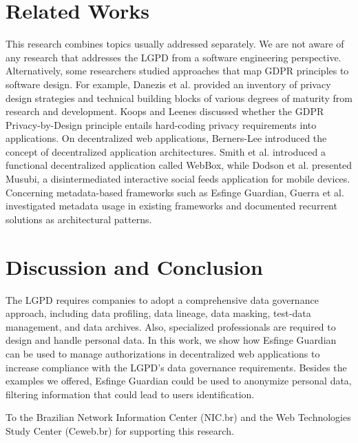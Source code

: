 \documentclass[sigconf]{acmart}
\begin{document}
\section{Related Works}

This research combines topics usually addressed separately. We are not aware of any research that addresses the LGPD from a software engineering perspective. Alternatively, some researchers studied approaches that map GDPR principles to software design. For example, Danezis et al. \cite{Ed2014} provided an inventory of privacy design strategies and technical building blocks of various degrees of maturity from research and development. Koops and Leenes \cite{Koops2014} discussed whether the GDPR Privacy-by-Design principle entails hard-coding privacy requirements into applications. On decentralized web applications, Berners-Lee \cite{Bern09} introduced the concept of decentralized application architectures. Smith et al. \cite{Smith2012} introduced a functional decentralized application called WebBox, while Dodson et al. \cite{Dodson2012} presented Musubi, a disintermediated interactive social feeds application for mobile devices. Concerning metadata-based frameworks such as Esfinge Guardian, Guerra et al. \cite{Guerra2010} investigated metadata usage in existing frameworks and documented recurrent solutions as architectural patterns.

\section{Discussion and Conclusion}

The LGPD requires companies to adopt a comprehensive data governance approach, including data profiling, data lineage, data masking, test-data management, and data archives. Also, specialized professionals are required to design and handle personal data. In this work, we show how Esfinge Guardian can be used to manage authorizations in decentralized web applications to increase compliance with the LGPD's data governance requirements. Besides the examples we offered, Esfinge Guardian could be used to anonymize personal data, filtering information that could lead to users identification.

%
\begin{acks}
To the Brazilian Network Information Center (NIC.br) and the Web Technologies Study Center (Ceweb.br) for supporting this research.
\end{acks}

%


\end{document}

